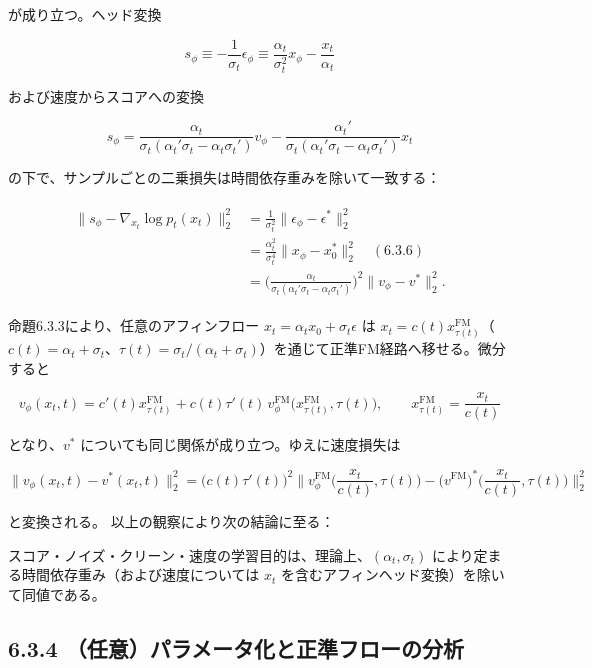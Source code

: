 が成り立つ。ヘッド変換

\[
s_\phi\equiv-\frac{1}{\sigma_t}\epsilon_\phi\equiv\frac{\alpha_t}{\sigma_t^2}x_\phi-\frac{x_t}{\alpha_t}
\]


および速度からスコアへの変換

\[
s_\phi=\frac{\alpha_t}{\sigma_t(\alpha_t'\sigma_t-\alpha_t\sigma_t')}v_\phi-\frac{\alpha_t'}{\sigma_t(\alpha_t'\sigma_t-\alpha_t\sigma_t')}x_t
\]


の下で、サンプルごとの二乗損失は時間依存重みを除いて一致する：

\begin{align*}
\begin{aligned}
\|s_\phi-\nabla_{x_t}\log p_t(x_t)\|_2^2
&=\frac{1}{\sigma_t^2}\|\epsilon_\phi-\epsilon^*\|_2^2 \\
&=\frac{\alpha_t^2}{\sigma_t^4}\|x_\phi-x_0^*\|_2^2 \quad (6.3.6) \\
&=\Biggl(\frac{\alpha_t}{\sigma_t(\alpha_t'\sigma_t-\alpha_t\sigma_t')}\Biggr)^2\|v_\phi-v^*\|_2^2.
\end{aligned}
\end{align*}


命題6.3.3により、任意のアフィンフロー $x_t=\alpha_t x_0+\sigma_t\epsilon$ は $x_t=c(t)x_{\tau(t)}^{\mathrm{FM}}$（$c(t)=\alpha_t+\sigma_t$、$\tau(t)=\sigma_t/(\alpha_t+\sigma_t)$）を通じて正準FM経路へ移せる。微分すると

\[
v_\phi(x_t,t)=c'(t)x_{\tau(t)}^{\mathrm{FM}}+c(t)\tau'(t)\,v_\phi^{\mathrm{FM}}\bigl(x_{\tau(t)}^{\mathrm{FM}},\tau(t)\bigr),\qquad
x_{\tau(t)}^{\mathrm{FM}}=\frac{x_t}{c(t)}
\]


となり、$v^*$ についても同じ関係が成り立つ。ゆえに速度損失は

\[
\|v_\phi(x_t,t)-v^*(x_t,t)\|_2^2=\bigl(c(t)\tau'(t)\bigr)^2\Biggl\|v_\phi^{\mathrm{FM}}\Biggl(\frac{x_t}{c(t)},\tau(t)\Biggr)-\bigl(v^{\mathrm{FM}}\bigr)^*\Biggl(\frac{x_t}{c(t)},\tau(t)\Biggr)\Biggr\|_2^2
\]


と変換される。
以上の観察により次の結論に至る：

\begin{propositionbox}[結論 6.3.2]
スコア・ノイズ・クリーン・速度の学習目的は、理論上、$(\alpha_t,\sigma_t)$ により定まる時間依存重み（および速度については $x_t$ を含むアフィンヘッド変換）を除いて同値である。
\end{propositionbox}


\subsection*{6.3.4 （任意）パラメータ化と正準フローの分析}


